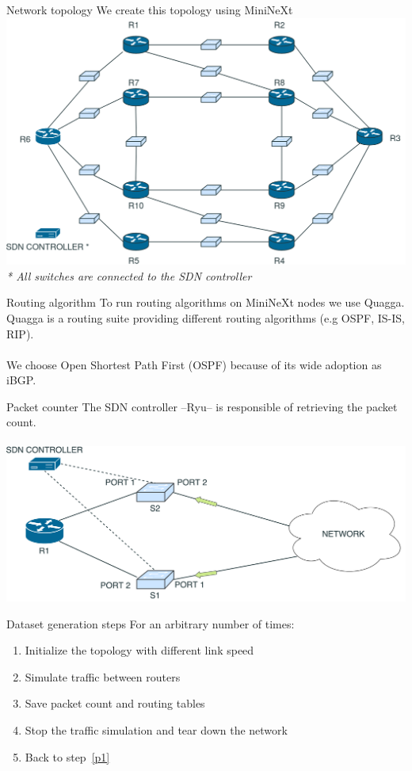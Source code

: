 \documentclass{beamer}
\begin{document}
\begin{frame}{Network topology}
	We create this topology using MiniNeXt
	\includegraphics[width=\textwidth]{img/network_arch}\\ 
	\tiny{\textit{* All switches are connected to the SDN controller}}	
\end{frame}
\begin{frame}{Routing algorithm}
	To run routing algorithms on MiniNeXt nodes we use Quagga.\\
	Quagga is a routing suite providing different routing algorithms (e.g OSPF, IS-IS, RIP).\\~\\
	We choose Open Shortest Path First (OSPF) because of its wide adoption as iBGP.\\
\end{frame}
\begin{frame}{Packet counter}
	The SDN controller --Ryu-- is responsible of retrieving the packet count.\\~\\
	\includegraphics[width=\textwidth]{img/packet_counter.pdf}
\end{frame}
\begin{frame}{Dataset generation steps}
	For an arbitrary number of times:
	\begin{enumerate}
	\item\label{p1} Initialize the topology with different link speed
	\item Simulate traffic between routers
	\item Save packet count and routing tables
	\item Stop the traffic simulation and tear down the network
	\item Back to step~\ref{p1}
	\end{enumerate}
\end{frame}
\end{document}
